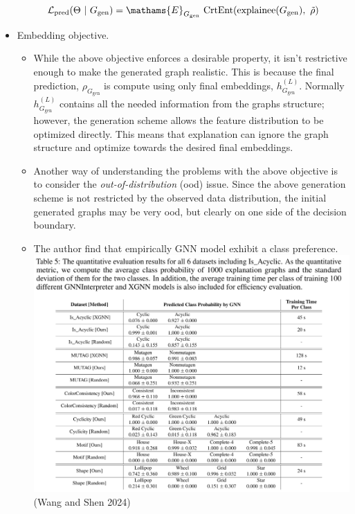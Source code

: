 \documentclass[
  11pt,
  letterpaper,
]{article}
\begin{document}
\begin{itemize}
  \begin{equation}
        \mathcal{L}_\text{pred} (\Theta \ | \ G_\text{gen}) = \mathams{E}_{G_\text{gen}} \ \text{CrtEnt} (\text{explainee}(G_\text{gen}), \ \tilde{\rho})
    \end{equation}
\item
  Embedding objective.

  \begin{itemize}
  \item
    While the above objective enforces a desirable property, it isn't
    restrictive enough to make the generated graph realistic. This is
    because the final prediction, \(\rho_{G_{\text{gen}}}\) is compute
    using only final embeddings, \(h^{(L)}_{G_{\text{gen}}}\). Normally
    \(h^{(L)}_{G_{\text{gen}}}\) contains all the needed information
    from the graphs structure; however, the generation scheme allows the
    feature distribution to be optimized directly. This means that
    explanation can ignore the graph structure and optimize towards the
    desired final embeddings.
  \item
    Another way of understanding the problems with the above objective
    is to consider the \emph{out-of-distribution} (ood) issue. Since the
    above generation scheme is not restricted by the observed data
    distribution, the initial generated graphs may be very ood, but
    clearly on one side of the decision boundary.
  \item
    The author find that empirically GNN model exhibit a class
    preference.\\
    \includegraphics{figures/random_baseline.png} (Wang and Shen 2024)
  \end{itemize}


\end{itemize}
\end{document}
